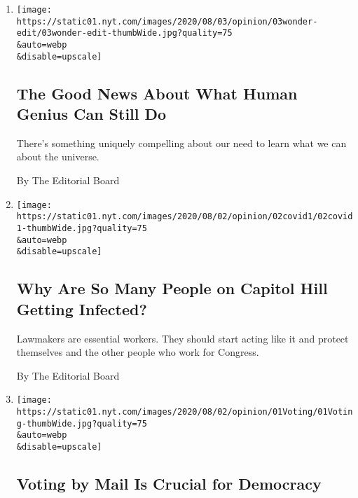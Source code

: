 \begin{enumerate}
\def\labelenumi{\arabic{enumi}.}
\item
  \href{/2020/08/03/opinion/spacex-stonehenge-mars.html}{}

  \texttt{[image: https://static01.nyt.com/images/2020/08/03/opinion/03wonder-edit/03wonder-edit-thumbWide.jpg?quality=75\\\&auto=webp\\\&disable=upscale]}

  \hypertarget{the-good-news-about-what-human-genius-can-still-do}{%
  \subsection{The Good News About What Human Genius Can Still
  Do}\label{the-good-news-about-what-human-genius-can-still-do}}

  There's something uniquely compelling about our need to learn what we
  can about the universe.

  By The Editorial Board
\item
  \href{/2020/08/02/opinion/coronavirus-gohmert-congress-testing.html}{}

  \texttt{[image: https://static01.nyt.com/images/2020/08/02/opinion/02covid1/02covid1-thumbWide.jpg?quality=75\\\&auto=webp\\\&disable=upscale]}

  \hypertarget{why-are-so-many-people-on-capitol-hill-getting-infected}{%
  \subsection{Why Are So Many People on Capitol Hill Getting
  Infected?}\label{why-are-so-many-people-on-capitol-hill-getting-infected}}

  Lawmakers are essential workers. They should start acting like it and
  protect themselves and the other people who work for Congress.

  By The Editorial Board
\item
  \href{/2020/08/01/opinion/sunday/mail-voting-covid-2020-election.html}{}

  \texttt{[image: https://static01.nyt.com/images/2020/08/02/opinion/01Voting/01Voting-thumbWide.jpg?quality=75\\\&auto=webp\\\&disable=upscale]}

  \hypertarget{voting-by-mail-is-crucial-for-democracy}{%
  \subsection{Voting by Mail Is Crucial for
  Democracy}\label{voting-by-mail-is-crucial-for-democracy}}


\end{enumerate}
